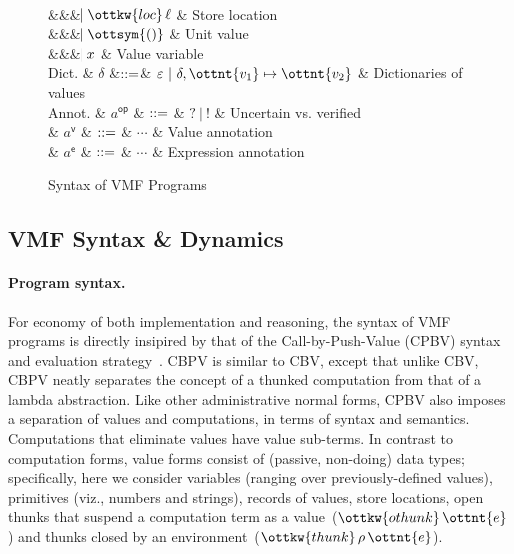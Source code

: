 \begin{figure}
\begin{grammar}
  \\ &&& $\bnfaltbrk \ottkw{loc} \, \ell$ & Store location
  \\ &&& $\bnfaltbrk \ottsym{()}$    & Unit value
  \\ &&& $\hspace{-1.02ex}\mathrel{\mid} x$     & Value variable
  \\
  Dict. & $\delta$
  &$\mathrel{::=}$& $\varepsilon~|~ \delta  ,  \ottnt{v_{{\mathrm{1}}}}  \mapsto  \ottnt{v_{{\mathrm{2}}}} $ & Dictionaries of values
  \\[2mm]
  Annot.
    & $a^{\textsf{op} }$ & $\mathrel{::=}$ & $ \textsf{?} ~|~ \texttt{!} $ & Uncertain vs. verified
  \\
    & $a^\textsf{v}$ & $\mathrel{::=}$ & $\cdots$ & Value annotation
  \\
    & $a^\textsf{e}$ & $\mathrel{::=}$ & $\cdots$ & Expression annotation

\end{grammar}
\caption{Syntax of VMF Programs}
\label{fig-syntax}
\end{figure}

\subsection{VMF Syntax \& Dynamics}

\paragraph{Program syntax.}
For economy of both implementation and reasoning, the syntax of VMF
programs is directly insipired by that of the Call-by-Push-Value
(CPBV) syntax and evaluation strategy~\cite{CBPV}.
%
CBPV is similar to CBV, except that unlike CBV, CBPV neatly separates
the concept of a thunked computation from that of a lambda
abstraction.
%
Like other administrative normal forms, CPBV also imposes a separation
of values and computations, in terms of syntax and semantics.
%
Computations that eliminate values have value sub-terms.
%
In contrast to computation forms, value forms consist of (passive,
non-doing) data types; specifically, here we consider variables
(ranging over previously-defined values), primitives (viz., numbers
and strings), records of values, store locations, open thunks that
suspend a computation term as a value~($\ottkw{othunk} \, \ottnt{e}$) and thunks
closed by an environment~($\ottkw{thunk} \, \rho \, \ottnt{e}$).

